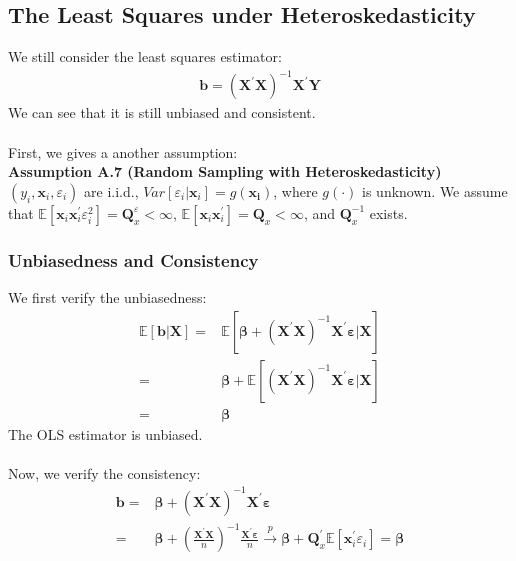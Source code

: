 \documentclass{article}
\begin{document}
\subsection{The Least Squares under Heteroskedasticity}
We still consider the least squares estimator:
	\begin{align*}
		\boldsymbol{b} = ( \boldsymbol{X}^\prime \boldsymbol{X} )^{-1} \boldsymbol{X}^\prime \boldsymbol{Y}
	\end{align*}
We can see that it is still unbiased and consistent.\\\\
First, we gives a another assumption:\\
\textbf{Assumption A.7 (Random Sampling with Heteroskedasticity)}\\
$(y_i, \boldsymbol{x}_i, \varepsilon_i)$ are i.i.d., $Var[\varepsilon_i | \boldsymbol{x}_i] = g(\boldsymbol{x_i})$, where $g(\cdot)$ is unknown. We assume that $\mathbb{E} [\boldsymbol{x}_i \boldsymbol{x}^\prime_i \varepsilon^2_i] = \boldsymbol{Q}^\varepsilon_x < \infty$, $\mathbb{E} [\boldsymbol{x}_i \boldsymbol{x}^\prime_i] = \boldsymbol{Q}_x < \infty$, and $\boldsymbol{Q}^{-1}_x$ exists.
\subsubsection{Unbiasedness and Consistency}
We first verify the unbiasedness:
	\begin{align*}
		\mathbb{E} [\boldsymbol{b} | \boldsymbol{X} ] = &\mathbb{E} [ \boldsymbol{\beta} + ( \boldsymbol{X}^\prime \boldsymbol{X} )^{-1} \boldsymbol{X}^\prime \boldsymbol{\varepsilon} | \boldsymbol{X} ]\\ = &
		\boldsymbol{\beta} + \mathbb{E} [ ( \boldsymbol{X}^\prime \boldsymbol{X} )^{-1} \boldsymbol{X}^\prime \boldsymbol{\varepsilon} | \boldsymbol{X} ]\\ = &
		\boldsymbol{\beta}
	\end{align*}
The OLS estimator is unbiased.\\\\
Now, we verify the consistency:  
	\begin{align*}
		\boldsymbol{b} = & \boldsymbol{\beta} + ( \boldsymbol{X}^\prime \boldsymbol{X} )^{-1} \boldsymbol{X}^\prime \boldsymbol{\varepsilon}\\ = &
		\boldsymbol{\beta} + ( \frac{\boldsymbol{X}^\prime \boldsymbol{X}}{n} )^{-1} \frac{\boldsymbol{X}^\prime \boldsymbol{\varepsilon}}{n} \xrightarrow{p}
		\boldsymbol{\beta} + \boldsymbol{Q}^\prime_x \mathbb{E}[ \boldsymbol{x}^\prime_i \varepsilon_i ] = \boldsymbol{\beta}
	\end{align*}
\end{document}
